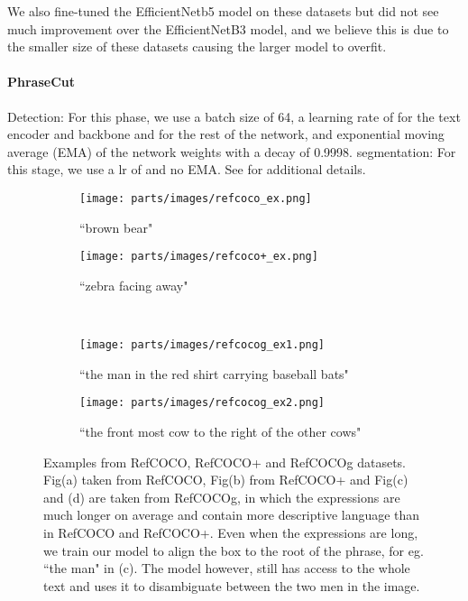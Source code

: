 We also fine-tuned the EfficientNetb5 model on these datasets but did not see much improvement over the EfficientNetB3 model, and we believe this is due to the smaller size of these datasets causing the larger model to overfit. 

\paragraph{PhraseCut}
Detection: For this phase, we use a batch size of 64, a learning rate of  for the text encoder and backbone and  for the rest of the network, and exponential moving average (EMA) of the network weights with a decay of 0.9998. segmentation: For this stage, we use a lr of  and no EMA. See \cite{carion2020end} for additional details. 


\begin{figure*}[t!]
    \centering
    \begin{subfigure}[t]{0.33\textwidth}
        \centering
        \texttt{[image: parts/images/refcoco\_ex.png]}
        \caption{``brown bear"}
    \end{subfigure}\hspace{-3mm}
    \begin{subfigure}[t]{0.33\textwidth}
        \centering
        \texttt{[image: parts/images/refcoco+\_ex.png]}
        \caption{``zebra facing away"}
    \end{subfigure} \\
    \begin{subfigure}[t]{0.3\columnwidth}
        \centering
        \texttt{[image: parts/images/refcocog\_ex1.png]}
        \caption{``the man in the red shirt carrying baseball bats"}
    \end{subfigure}
    \hspace{2mm}
    \begin{subfigure}[t]{0.3\textwidth}
        \centering
        \texttt{[image: parts/images/refcocog\_ex2.png]}
        \caption{``the front most cow to the right of the other cows"}
    \end{subfigure}\caption{Examples from RefCOCO, RefCOCO+ and RefCOCOg datasets. Fig(a) taken from RefCOCO, Fig(b) from RefCOCO+ and Fig(c) and (d) are taken from RefCOCOg, in which the expressions are much longer on average and contain more descriptive language than in RefCOCO and RefCOCO+. Even when the expressions are long, we train our model to align the box to the root of the phrase, for eg. ``the man" in (c). The model however, still has access to the whole text and uses it to disambiguate between the two men in the image.
    \label{fig:refexp_examples}}
\end{figure*}








